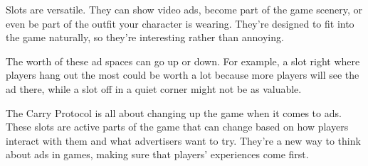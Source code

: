 Slots are versatile. They can show video ads, become part of the game scenery, or even be part of the outfit your character is wearing. They're designed to fit into the game naturally, so they're interesting rather than annoying.

The worth of these ad spaces can go up or down. For example, a slot right where players hang out the most could be worth a lot because more players will see the ad there, while a slot off in a quiet corner might not be as valuable.

The Carry Protocol is all about changing up the game when it comes to ads. These slots are active parts of the game that can change based on how players interact with them and what advertisers want to try. They're a new way to think about ads in games, making sure that players' experiences come first.